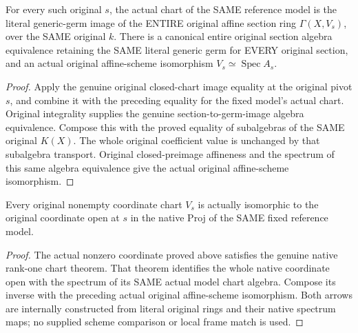 \begin{theorem}
\label{thm:seven-original-fixed-model-all-chart-sections-route}
\leanok
{}
For every such original $s$, the actual chart of the SAME reference
model is the literal generic-germ image of the ENTIRE original affine
section ring $\Gamma(X,V_s)$, over the SAME original $k$. There is a
canonical entire original section algebra equivalence retaining the
SAME literal generic germ for EVERY original section, and an actual
original affine-scheme isomorphism $V_s\simeq\operatorname{Spec}A_s$.
\end{theorem}
\begin{proof}
Apply the genuine original closed-chart image equality at the original
pivot $s$, and combine it with the preceding equality for the fixed
model's actual chart. Original integrality supplies the genuine
section-to-germ-image algebra equivalence. Compose this with the
proved equality of subalgebras of the SAME original $K(X)$. The whole
original coefficient value is unchanged by that subalgebra transport.
Original closed-preimage affineness and the spectrum of this same
algebra equivalence give the actual original affine-scheme isomorphism.
\end{proof}

\begin{theorem}
\label{thm:seven-original-fixed-model-native-chart-isomorphisms-route}
\leanok
{}
Every original nonempty coordinate chart $V_s$ is actually isomorphic
to the original coordinate open at $s$ in the native Proj of the SAME
fixed reference model.
\end{theorem}
\begin{proof}
The actual nonzero coordinate proved above satisfies the genuine
native rank-one chart theorem. That theorem identifies the whole
native coordinate open with the spectrum of its SAME actual model
chart algebra. Compose its inverse with the preceding actual original
affine-scheme isomorphism. Both arrows are internally constructed from
literal original rings and their native spectrum maps; no supplied
scheme comparison or local frame match is used.
\end{proof}

